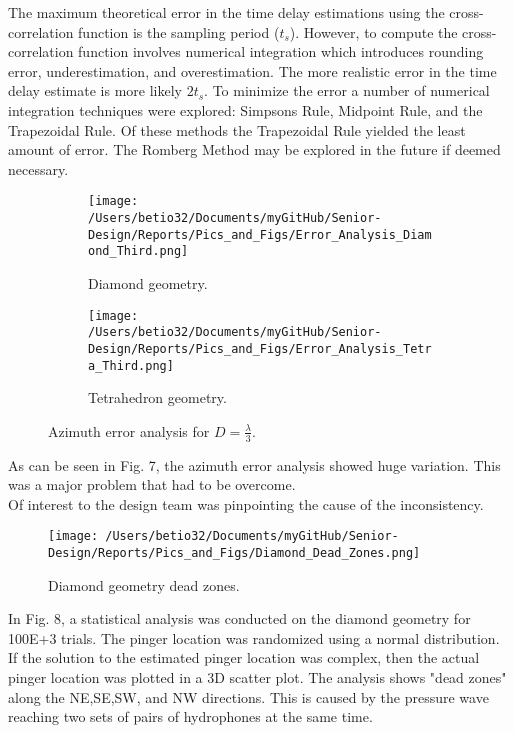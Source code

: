 \documentclass[12pt]{article}
\begin{document}
\noindent The maximum theoretical error in the time delay estimations using the cross-correlation function is the sampling period ($t_s$). However, to compute the cross-correlation function involves numerical integration which introduces rounding error, underestimation, and overestimation. The more realistic error in the time delay estimate is more likely $2t_s$. To minimize the error a number of numerical integration techniques were explored: Simpsons Rule, Midpoint Rule, and the Trapezoidal Rule. Of these methods the Trapezoidal Rule yielded the least amount of error. The Romberg Method may be explored in the future if deemed necessary. 

\pagebreak

\begin{figure}[!h]
	\centering
	\begin{subfigure}{.5\textwidth}
  		\centering
  		\texttt{[image: /Users/betio32/Documents/myGitHub/Senior-Design/Reports/Pics\_and\_Figs/Error\_Analysis\_Diamond\_Third.png]}
  		\caption{Diamond geometry.}
  		\label{fig:Error_Analysis_Diamond_Third}
	\end{subfigure}%
	\begin{subfigure}{.5\textwidth}
  		\centering
  		\texttt{[image: /Users/betio32/Documents/myGitHub/Senior-Design/Reports/Pics\_and\_Figs/Error\_Analysis\_Tetra\_Third.png]}
  		\caption{Tetrahedron geometry.}
  		\label{fig:Error_Analysis_Tetra_Third}
	\end{subfigure}
	\caption{Azimuth error analysis for $D=\frac{\lambda}{3}$.}
\end{figure}

\noindent As can be seen in Fig. 7, the azimuth error analysis showed huge variation. This was a major problem that had to be overcome.\\

\noindent Of interest to the design team was pinpointing the cause of the inconsistency.

\begin{figure}[!h]
	\centering
	\texttt{[image: /Users/betio32/Documents/myGitHub/Senior-Design/Reports/Pics\_and\_Figs/Diamond\_Dead\_Zones.png]}
    \caption{Diamond geometry dead zones.} \label{fig:Dimaond_Dead_Zones}
\end{figure}

\noindent In Fig. 8, a statistical analysis was conducted on the diamond geometry for 100E+3 trials. The pinger location was randomized using a normal distribution. If the solution to the estimated pinger location was complex, then the actual pinger location was plotted in a 3D scatter plot. The analysis shows "dead zones" along the NE,SE,SW, and NW directions. This is caused by the pressure wave reaching two sets of pairs of hydrophones at the same time. 
\end{document}
